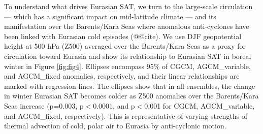 \documentclass{nature}
\begin{document}

To understand what drives Eurasian SAT, we turn to the large-scale circulation --- which has a significant impact on mid-latitude climate \cite{horton15,sigmond15} --- and its manifestation over the Barents/Kara Seas where anomalous anti-cyclones have been linked with Eurasian cold episodes (@@cite). We use DJF geopotential height at 500 hPa (Z500) averaged over the Barents/Kara Seas as a proxy for circulation toward Eurasia and show its relationship to Eurasian SAT in boreal winter in Figure \ref{fig:fig4}. Ellipses encompass 95\% of CGCM, AGCM\_variable, and AGCM\_fixed anomalies, respectively, and their linear relationships are marked with regression lines. The ellipses show that in all ensembles, the change in winter Eurasian SAT becomes colder as Z500 anomalies over the Barents/Kara Seas increase (p=0.003, p$<$0.0001, and p$<$0.001 for CGCM, AGCM\_variable, and AGCM\_fixed, respectively). This is representative of varying strengths of thermal advection of cold, polar air to Eurasia by anti-cyclonic motion.

\end{document}
